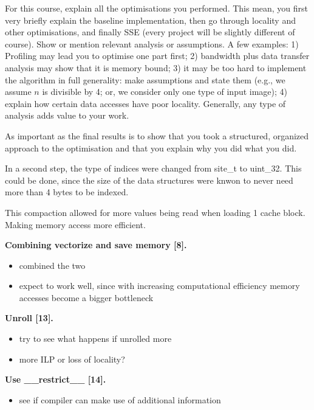 \documentclass[letterpaper]{article}
\newcommand{\mypar}[1]{{\bf #1.}}
\begin{document}
For this course, explain all the optimisations you performed. This mean, you first very briefly
explain the baseline implementation, then go through locality and other optimisations, and finally SSE (every project will be slightly different of course). Show or mention relevant analysis or assumptions. A few examples: 1) Profiling may lead you to optimise one part first; 2) bandwidth plus data transfer analysis may show that it is memory bound; 3) it may be too hard to implement the algorithm in full generality: make assumptions and state them (e.g., we assume $n$ is divisible by 4; or, we consider only one type of input image); 4) explain how certain data accesses have poor locality. Generally, any type of analysis adds value to your work.

As important as the final results is to show that you took a structured, organized approach to the optimisation and that you explain why you did what you did.

In a second step, the type of indices were changed from site\_t to uint\_32. This could be done, since the size of the data structures were knwon to never need more than 4 bytes to be indexed.

This compaction allowed for more values being read when loading 1 cache block. Making memory access more efficient.

\mypar{Combining vectorize and save memory [8]}
\begin{itemize}
\item combined the two
\item expect to work well, since with increasing computational efficiency memory accesses become a bigger bottleneck
\end{itemize}

\mypar{Unroll [13]}
\begin{itemize}
\item try to see what happens if unrolled more
\item more ILP or loss of locality?
\end{itemize}

\mypar{Use \_\_restrict\_\_ [14]}
\begin{itemize}
\item see if compiler can make use of additional information
\end{itemize}
\end{document}

